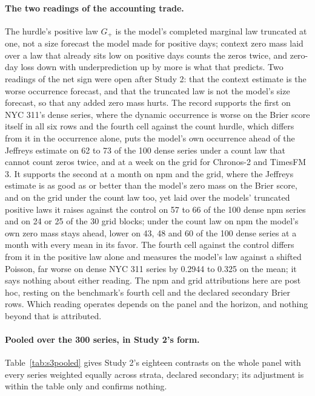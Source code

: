 \paragraph{The two readings of the accounting trade.} The hurdle's positive law $G_+$ is the model's completed
marginal law truncated at one, not a size forecast the model made for positive days; context zero mass laid
over a law that already sits low on positive days counts the zeros twice, and zero-day loss down with
underprediction up by more is what that predicts. Two readings of the net sign were open after Study 2: that
the context estimate is the worse occurrence forecast, and that the truncated law is not the model's size
forecast, so that any added zero mass hurts. The record supports the first on NYC 311's dense series, where
the dynamic occurrence is worse on the Brier score itself in all six rows and the fourth cell against the
count hurdle, which differs from it in the occurrence alone, puts the model's own occurrence ahead of the
Jeffreys estimate on 62 to 73 of the 100 dense series under a count law that cannot count zeros twice, and at
a week on the grid for Chronos-2 and TimesFM 3. It supports the second at a month on npm and the grid, where
the Jeffreys estimate is as good as or better than the model's zero mass on the Brier score, and on the grid
under the count law too, yet laid over the models' truncated positive laws it raises \qs{} against the control
on 57 to 66 of the 100 dense npm series and on 24 or 25 of the 30 grid blocks; under the count law on npm the
model's own zero mass stays ahead, lower on 43, 48 and 60 of the 100 dense series at a month with every mean
in its favor. The fourth cell against the control differs from it in the positive law alone and measures the
model's law against a shifted Poisson, far worse on dense NYC 311 series by 0.2944 to 0.325 on the mean; it
says nothing about either reading. The npm and grid attributions here are post hoc, resting on the
benchmark's fourth cell and the declared secondary Brier rows. Which reading operates depends on the panel
and the horizon, and nothing beyond that is attributed.

\paragraph{Pooled over the 300 series, in Study 2's form.} Table~\ref{tab:s3pooled} gives Study 2's
eighteen contrasts on the whole panel with every series weighted equally across strata, declared secondary;
its adjustment is within the table only and confirms nothing.

